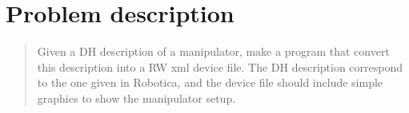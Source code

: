 \section{Problem description}
\label{sec:description}

\begin{quote}
Given a DH description of a manipulator, make a program that convert this description into a RW xml device file. The DH description correspond to the one given in Robotica, and the device file should include simple graphics to show the manipulator setup.
\end{quote}
